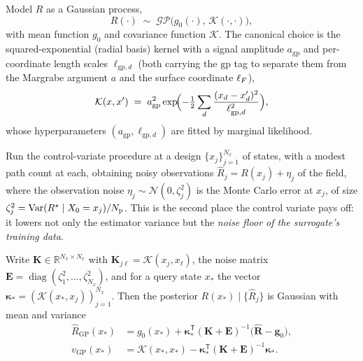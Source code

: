 \begin{definition}\label{def:num:gpprior}
Model $R$ as a Gaussian process,
\[
   R(\cdot) \;\sim\; \mathcal{GP}\bigl(g_0(\cdot),\, \mathcal{K}(\cdot,\cdot)\bigr),
\]
with mean function $g_0$ and covariance function $\mathcal{K}$. The canonical
choice is the squared-exponential (radial basis) kernel with a signal amplitude
$a_{\mathrm{gp}}$ and per-coordinate length scales $\ell_{\mathrm{gp},d}$ (both
carrying the $\mathrm{gp}$ tag to separate them from the Margrabe argument $a$
and the surface coordinate $\ell_F$),
\begin{equation}\label{eq:num:rbf}
   \mathcal{K}(x, x') \;=\; a_{\mathrm{gp}}^2 \exp\!\Bigl(
      -\tfrac12 \sum_{d} \frac{(x_d - x'_d)^2}{\ell_{\mathrm{gp},d}^2}\Bigr),
\end{equation}
whose hyperparameters $(a_{\mathrm{gp}}, \ell_{\mathrm{gp},d})$ are fitted by
marginal likelihood.
\end{definition}

Run the control-variate procedure at a design $\{x_j\}_{j=1}^{N_{x}}$ of states,
with a modest path count at each, obtaining noisy observations
$\hat R_j = R(x_j) + \eta_j$ of the field, where the observation noise
$\eta_j \sim \mathcal{N}(0, \zeta_j^2)$ is the Monte Carlo error at $x_j$,
of size $\zeta_j^2 = \operatorname{Var}(R^\star \mid X_0 = x_j)/N_{\mathrm{p}}$. This is the second
place the control variate pays off: it lowers not only the estimator variance
but the \emph{noise floor of the surrogate's training data}.

\begin{theorem}[GP posterior]\label{thm:num:gppost}
Write $\mathbf K \in \mathbb{R}^{N_{x}\times N_{x}}$ with
$\mathbf K_{j\ell} = \mathcal{K}(x_j, x_\ell)$, the noise matrix
$\mathbf E = \operatorname{diag}(\zeta_1^2,\dots,\zeta_{N_{x}}^2)$, and
for a query state $x_\ast$ the vector
$\boldsymbol{\kappa}_\ast = (\mathcal{K}(x_\ast, x_j))_{j=1}^{N_{x}}$. Then the
posterior $R(x_\ast)\mid \{\hat R_j\}$ is Gaussian with mean and variance
\begin{align}
   \hat R_{\mathrm{GP}}(x_\ast)
     &= g_0(x_\ast) + \boldsymbol{\kappa}_\ast^{\mathsf T}
        (\mathbf K + \mathbf E)^{-1}\bigl(\hat{\mathbf R} - \mathbf g_0\bigr),
        \label{eq:num:gpmean}\\[2pt]
   v_{\mathrm{GP}}(x_\ast)
     &= \mathcal{K}(x_\ast, x_\ast) - \boldsymbol{\kappa}_\ast^{\mathsf T}
        (\mathbf K + \mathbf E)^{-1}\boldsymbol{\kappa}_\ast.
        \label{eq:num:gpvar}
\end{align}
\end{theorem}

